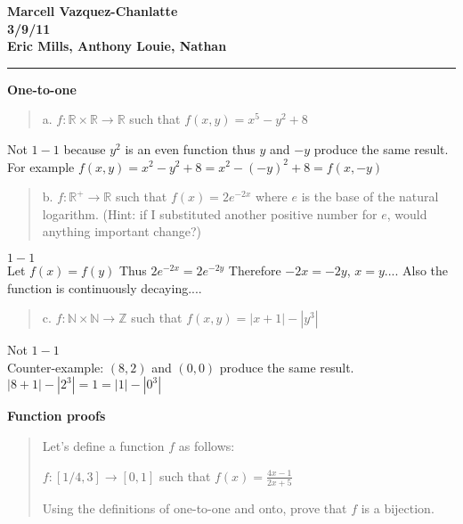 \documentclass[12pt]{article}
\begin{document}
\begin{center}
{\LARGE
\textbf{Marcell Vazquez-Chanlatte}
\\
\textbf{3/9/11}
\\
\textbf{Eric Mills, Anthony Louie, Nathan}
\\[1ex]}

\end{center}

\bigskip\hrule

\begin{enumerate}


\item \textbf{One-to-one}

\begin{quote}
 \item a. $f: \mathbb{R} \times \mathbb{R} \rightarrow \mathbb{R}$ such that $f(x,y) = x^5-y^2+8$
\end{quote}

 Not $1-1$ because $y^2$ is an even function thus $y$ and $-y$ produce the same result.\\
 For example $f(x,y) = x^2 - y^2 + 8 = x^2 - (-y)^2 + 8 = f(x,-y)$

\begin{quote}
 \item b. $f: \mathbb{R}^+ \rightarrow \mathbb{R}$ such that $f(x) = 2e^{-2x}$
  where $e$ is the base of the natural logarithm.   (Hint:  if I substituted
  another positive number for $e$, would anything important change?)
\end{quote}

 $1-1$\\
 Let $f(x) = f(y)$
 Thus $2e^{-2x} = 2e^{-2y}$
 Therefore $-2x = -2y$, $x=y$....
 Also the function is continuously decaying....
\begin{quote}
 \item c. $f: \mathbb{N} \times \mathbb{N} \rightarrow \mathbb{Z}$ such that $f(x,y) = \left|x+1\right|-\left|y^3\right|$
\end{quote}

 Not $1-1$\\
 Counter-example: $(8,2)$ and $(0,0)$ produce the same result. $|8+1| - |2^3| = 1 = |1| -|0^3|$
\newpage
\item \textbf{Function proofs}


\begin{quote}
\item Let's define a function $f$ as follows:
\item $f: [1/4,3] \rightarrow [0,1] $ such that $f(x) = \frac{4x-1}{2x+5}$
\item Using the definitions of one-to-one and onto, prove that $f$ is a
bijection. 
\end{quote}


\end{enumerate}
\end{document}
